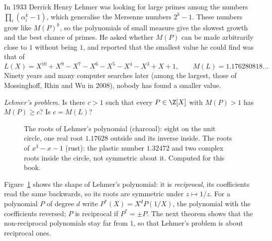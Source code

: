In 1933 Derrick Henry Lehmer was looking for large primes among the numbers $\prod_i(\alpha_i^k-1)$, which generalise the Mersenne numbers $2^k-1$. These
numbers grow like $M(P)^k$, so the polynomials of small measure give the slowest growth and the best chance of primes. He asked whether $M(P)$ can be
made arbitrarily close to $1$ without being $1$, and reported that the smallest value he could find was that of
\[
L(X)=X^{10}+X^9-X^7-X^6-X^5-X^4-X^3+X+1,\qquad M(L)=1.176280818\ldots
\]
Ninety years and many computer searches later (among the largest, those of Mossinghoff, Rhin and Wu in 2008), nobody has found a smaller value.

\begin{center}
\emph{Lehmer's problem.} Is there $c>1$ such that every $P\in\Z[X]$ with $M(P)>1$ has $M(P)\ge c$? Is $c=M(L)$?
\end{center}

\begin{figure}[ht]
\centering
{}
\caption{The roots of Lehmer's polynomial (charcoal): eight on the unit circle, one real root $1.17628$ outside and its inverse inside. The roots of $x^3-x-1$
(rust): the plastic number $1.32472$ and two complex roots inside the circle, not symmetric about it. Computed for this book.}
\label{conjectures:fig:lehmer}
\end{figure}

Figure~\ref{conjectures:fig:lehmer} shows the shape of Lehmer's polynomial: it is \emph{reciprocal}, its coefficients read the same backwards, so its roots are
symmetric under $z\mapsto1/z$. For a polynomial $P$ of degree $d$ write $P^*(X)=X^dP(1/X)$, the polynomial with the coefficients reversed; $P$ is reciprocal
if $P^*=\pm P$. The next theorem shows that the non-reciprocal polynomials stay far from $1$, so that Lehmer's problem is about reciprocal ones.

